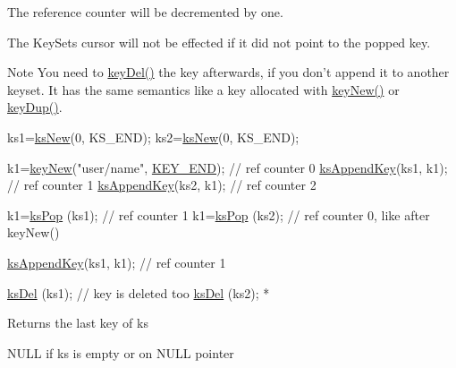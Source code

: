 The reference counter will be decremented by one.

The Key\-Sets cursor will not be effected if it did not point to the popped key.

\begin{DoxyNote}{Note}
You need to \hyperlink{group__key_ga3df95bbc2494e3e6703ece5639be5bb1}{key\-Del()} the key afterwards, if you don't append it to another keyset. It has the same semantics like a key allocated with \hyperlink{group__key_gad23c65b44bf48d773759e1f9a4d43b89}{key\-New()} or \hyperlink{group__key_gae6ec6a60cc4b8c1463fa08623d056ce3}{key\-Dup()}.
\end{DoxyNote}

\begin{DoxyCode}
ks1=\hyperlink{group__keyset_ga671e1aaee3ae9dc13b4834a4ddbd2c3c}{ksNew}(0, KS\_END);
ks2=\hyperlink{group__keyset_ga671e1aaee3ae9dc13b4834a4ddbd2c3c}{ksNew}(0, KS\_END);

k1=\hyperlink{group__key_gad23c65b44bf48d773759e1f9a4d43b89}{keyNew}(\textcolor{stringliteral}{"user/name"}, \hyperlink{group__key_gga91fb3178848bd682000958089abbaf40aa8adb6fcb92dec58fb19410eacfdd403}{KEY\_END}); \textcolor{comment}{// ref counter 0}
\hyperlink{group__keyset_gaa5a1d467a4d71041edce68ea7748ce45}{ksAppendKey}(ks1, k1); \textcolor{comment}{// ref counter 1}
\hyperlink{group__keyset_gaa5a1d467a4d71041edce68ea7748ce45}{ksAppendKey}(ks2, k1); \textcolor{comment}{// ref counter 2}

k1=\hyperlink{group__keyset_gae42530b04defb772059de0600159cf69}{ksPop} (ks1); \textcolor{comment}{// ref counter 1}
k1=\hyperlink{group__keyset_gae42530b04defb772059de0600159cf69}{ksPop} (ks2); \textcolor{comment}{// ref counter 0, like after keyNew()}

\hyperlink{group__keyset_gaa5a1d467a4d71041edce68ea7748ce45}{ksAppendKey}(ks1, k1); \textcolor{comment}{// ref counter 1}

\hyperlink{group__keyset_ga27e5c16473b02a422238c8d970db7ac8}{ksDel} (ks1); \textcolor{comment}{// key is deleted too}
\hyperlink{group__keyset_ga27e5c16473b02a422238c8d970db7ac8}{ksDel} (ks2);
 *
\end{DoxyCode}


\begin{DoxyReturn}{Returns}
the last key of {\ttfamily ks} 

N\-U\-L\-L if {\ttfamily ks} is empty or on N\-U\-L\-L pointer 
\end{DoxyReturn}

